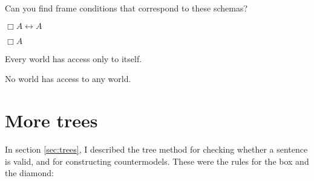 \begin{exercise}
  Can you find frame conditions that correspond to these schemas?
  \begin{exlist}
  \item $\Box A \leftrightarrow A$
  \item $\Box A$
  \end{exlist}
\end{exercise}
\begin{solution}
  \begin{sollist}
  \item Every world has access only to itself.
  \item No world has access to any world.
  \end{sollist}
\end{solution}

\section{More trees}
\label{sec:more-trees}

In section \ref{sec:trees}, I described the tree method for checking whether a
sentence is valid, and for constructing countermodels. These were the rules for
the box and the diamond:

\bigskip

\begin{minipage}{0.24\textwidth} \centering
{}
\end{minipage}
\begin{minipage}{0.24\textwidth}\centering
{}
\end{minipage}
\begin{minipage}{0.24\textwidth}\centering
{}
\end{minipage}
\begin{minipage}{0.24\textwidth}\centering
{}
\end{minipage}
%

